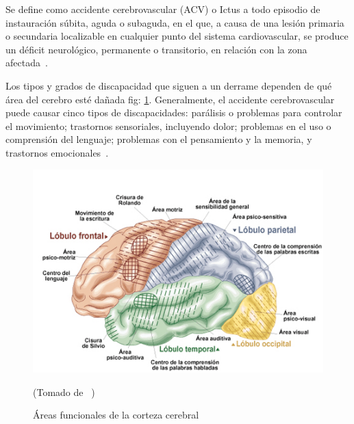 
Se define como accidente cerebrovascular (ACV) o Ictus a todo episodio de instauración súbita, aguda o subaguda, en el que, a causa de una lesión primaria o secundaria localizable en cualquier punto del sistema cardiovascular, se produce un déficit neurológico, permanente o transitorio, en relación con la zona afectada~\cite{ictus}.

Los tipos y grados de discapacidad que siguen a un derrame dependen de qué área del cerebro esté dañada fig: \ref{fig: cerebralcortex}. Generalmente, el accidente cerebrovascular puede causar cinco tipos de discapacidades: parálisis o problemas para controlar el movimiento; trastornos sensoriales, incluyendo dolor; problemas en el uso o comprensión del lenguaje; problemas con el pensamiento y la memoria, y trastornos emocionales~\cite{post-strok}. 

\begin{figure}[ht]
    \centering
    \includegraphics[scale=0.5]{images/brain.jpg}
    \caption{Áreas funcionales de la corteza cerebral}
    (Tomado de ~\cite{areacereabral})
    \label{fig: cerebralcortex}
\end{figure}

